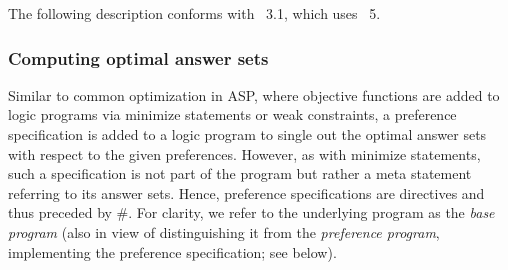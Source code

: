 The following description conforms with \asprin~3.1, which uses \clingo~5.%

\subsubsection{Computing optimal answer sets}

Similar to common optimization in ASP,
where objective functions are added to logic programs
via minimize statements or weak constraints,
a preference specification is added to a logic program
to single out the optimal answer sets with respect to the given preferences.
However, as with minimize statements,
such a specification is not part of the program
but rather a meta statement referring to its answer sets.
Hence, preference specifications are directives and thus preceded by \#.
For clarity, we refer to the underlying program as the \emph{base program}
(also in view of distinguishing it from the \emph{preference program},
implementing the preference specification; see below).

